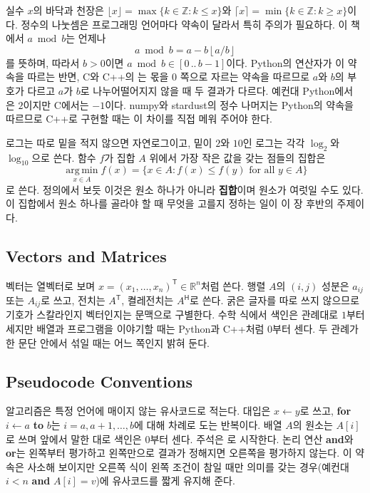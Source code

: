 실수 $x$의 바닥과 천장은 $\lfloor x\rfloor=\max\{k\in\mathbb{Z}:k\le x\}$와 $\lceil x\rceil=\min\{k\in\mathbb{Z}:k\ge x\}$이다. 정수의 나눗셈은 프로그래밍 언어마다 약속이 달라서 특히 주의가 필요하다. 이 책에서 $a\bmod b$는 언제나
\[
a\bmod b=a-b\left\lfloor a/b\right\rfloor
\]
를 뜻하며, 따라서 $b>0$이면 $a\bmod b\in[0\,..\,b-1]$이다. Python의 \code{\%} 연산자가 이 약속을 따르는 반면, C와 C++의 \code{\%}는 몫을 $0$ 쪽으로 자르는 약속을 따르므로 $a$와 $b$의 부호가 다르고 $a$가 $b$로 나누어떨어지지 않을 때 두 결과가 다르다. 예컨대 Python에서 은 $2$이지만 C에서는 $-1$이다. numpy와 stardust의 정수 나머지는 Python의 약속을 따르므로 C++로 구현할 때는 이 차이를 직접 메워 주어야 한다.

로그는 따로 밑을 적지 않으면 자연로그이고, 밑이 $2$와 $10$인 로그는 각각 $\log_2$와 $\log_{10}$으로 쓴다. 함수 $f$가 집합 $A$ 위에서 가장 작은 값을 갖는 점들의 집합은
\[
\operatorname*{arg\,min}_{x\in A}f(x)=\{x\in A: f(x)\le f(y)\text{ for all }y\in A\}
\]
로 쓴다. 정의에서 보듯 이것은 원소 하나가 아니라 \textbf{집합}이며 원소가 여럿일 수도 있다. 이 집합에서 원소 하나를 골라야 할 때 무엇을 고를지 정하는 일이 이 장 후반의 주제이다.

\subsection{Vectors and Matrices}

벡터는 열벡터로 보며 $x=(x_1,\dots,x_n)^{\mathsf T}\in\mathbb{R}^n$처럼 쓴다. 행렬 $A$의 $(i,j)$ 성분은 $a_{ij}$ 또는 $A_{ij}$로 쓰고, 전치는 $A^{\mathsf T}$, 켤레전치는 $A^{\mathsf H}$로 쓴다. 굵은 글자를 따로 쓰지 않으므로 기호가 스칼라인지 벡터인지는 문맥으로 구별한다. 수학 식에서 색인은 관례대로 $1$부터 세지만 배열과 프로그램을 이야기할 때는 Python과 C++처럼 $0$부터 센다. 두 관례가 한 문단 안에서 섞일 때는 어느 쪽인지 밝혀 둔다.

\subsection{Pseudocode Conventions}

알고리즘은 특정 언어에 매이지 않는 유사코드로 적는다. 대입은 $x\gets y$로 쓰고, \textbf{for} $i\gets a$ \textbf{to} $b$는 $i=a,a+1,\dots,b$에 대해 차례로 도는 반복이다. 배열 $A$의 원소는 $A[i]$로 쓰며 앞에서 말한 대로 색인은 $0$부터 센다. 주석은 \code{//}로 시작한다. 논리 연산 \textbf{and}와 \textbf{or}는 왼쪽부터 평가하고 왼쪽만으로 결과가 정해지면 오른쪽을 평가하지 않는다. 이 약속은 사소해 보이지만 오른쪽 식이 왼쪽 조건이 참일 때만 의미를 갖는 경우(예컨대 $i<n$ \textbf{and} $A[i]=v$)에 유사코드를 짧게 유지해 준다.


